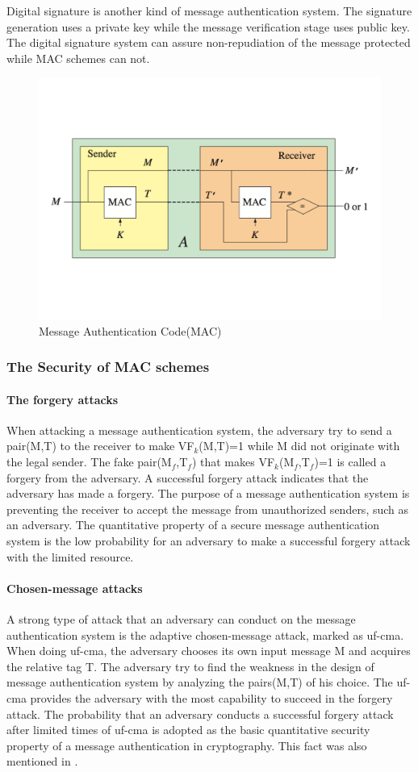 \documentclass{article}
\begin{document}
Digital signature is another kind of message authentication system. The signature generation uses a private key while the message verification stage uses public key. The digital signature system can assure non-repudiation of the message protected while MAC schemes can not.
\begin{figure}[htbp]
\centering
\includegraphics[scale=0.4]{./diagram/MAC.pdf}
\caption{Message Authentication Code(MAC)}
\label{fig:2 }
\end{figure}
\subsubsection{The Security of MAC schemes}
\paragraph{The forgery attacks}
When attacking a message authentication system, the adversary try to send a pair(M,T) to the receiver to make VF$_k$(M,T)=1 while M did not originate with the legal sender. The fake pair(M$_f$,T$_f$) that makes VF$_k$(M$_f$,T$_f$)=1 is called a forgery from the adversary. A successful forgery attack indicates that the adversary has made a forgery. 
The purpose of a message authentication system is preventing the receiver to accept the message from unauthorized senders, such as an adversary. The quantitative property of a secure message authentication system is the low probability for an adversary to make a successful forgery attack with the limited resource.
\paragraph{Chosen-message attacks}
A strong type of attack that an adversary can conduct on the message authentication system is the adaptive chosen-message attack, marked as uf-cma. When doing uf-cma, the adversary chooses its own input message M and acquires the relative tag T. The adversary try to find the weakness in the design of message authentication system by analyzing the pairs(M,T) of his choice. The uf-cma provides the adversary with the most capability to succeed in the forgery attack. The probability that an adversary conducts a successful forgery attack after limited times of uf-cma is adopted as the basic quantitative security property of a message authentication in cryptography. This fact was also mentioned in \cite{Rogaway2011}.
\end{document}
